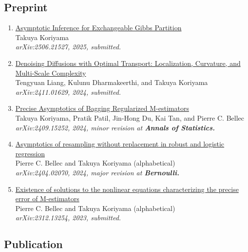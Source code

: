 \documentclass[10pt]{amsart}
\begin{document}
\subsection*{Preprint}
\begin{enumerate}
\item \href{https://arxiv.org/abs/2506.21527}{Asymptotic Inference for Exchangeable Gibbs Partition}\\
Takuya Koriyama\\
\textit{arXiv:2506.21527, 2025, submitted.}

\item \href{https://arxiv.org/abs/2411.01629}{Denoising Diffusions with Optimal Transport: Localization, Curvature, and Multi-Scale Complexity}\\
Tengyuan Liang, Kulunu Dharmakeerthi, and Takuya Koriyama \\
\textit{arXiv:2411.01629, 2024, submitted.}

\item \href{https://arxiv.org/abs/2409.15252}{Precise Asymptotics of Bagging Regularized M-estimators}\\
Takuya Koriyama, Pratik Patil, Jin-Hong Du, Kai Tan, and Pierre C. Bellec \\
\textit{arXiv:2409.15252, 2024, minor revision at \textbf{Annals of Statistics.}}

\item \href{https://arxiv.org/abs/2404.02070}{Asymptotics of resampling without replacement in robust and logistic regression}\\
Pierre C. Bellec and Takuya Koriyama (alphabetical)\\
\textit{arXiv:2404.02070, 2024, major revision at \textbf{Bernoulli.}}

\item \href{https://arxiv.org/abs/2312.13254}{Existence of solutions to the nonlinear equations characterizing the precise error of M-estimators}\\
Pierre C. Bellec and Takuya Koriyama (alphabetical)\\
\textit{arXiv:2312.13254, 2023, submitted.}
\end{enumerate}

\subsection*{Publication}
\end{document}
